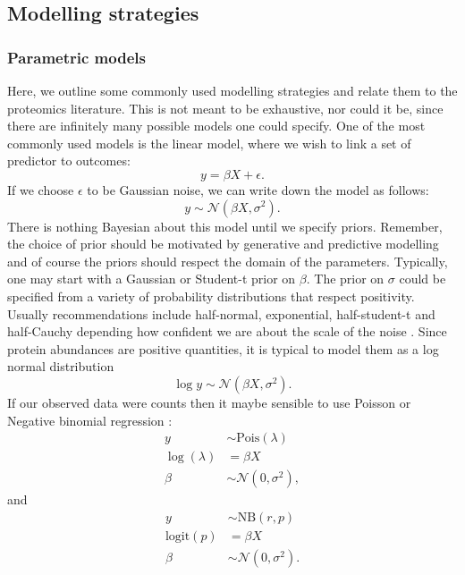 \documentclass[12pt,english, journal=jpr, layout=twocolumn]{article}
\begin{document}
\subsection{Modelling strategies}
\subsubsection{Parametric models}
Here, we outline some commonly used modelling strategies and relate them to the proteomics literature. This is not meant to be exhaustive, nor could it be, since there are infinitely many possible models one could specify. One of the most commonly used models is the linear model, where we wish to link a set of predictor to outcomes:
\begin{equation}
y = \beta X + \epsilon.
\end{equation}
If we choose $\epsilon$ to be Gaussian noise, we can write down the model as follows:
\begin{equation}
y \sim \mathcal{N}(\beta X, \sigma^2).
\end{equation}
There is nothing Bayesian about this model until we specify priors. Remember, the choice of prior should be motivated by generative and predictive modelling and of course the priors should respect the domain of the parameters. Typically, one may start with a Gaussian or Student-t prior on $\beta$. The prior on $\sigma$ could be specified from a variety of probability distributions that respect positivity. Usually recommendations include half-normal, exponential, half-student-t and half-Cauchy depending how confident we are about the scale of the noise \citep{Gelman::2017}. Since protein abundances are positive quantities, it is typical to model them as a log normal distribution
\begin{equation}
\log y  \sim \mathcal{N}(\beta X, \sigma^2).
\end{equation}   	
If our observed data were counts then it maybe sensible to use Poisson or Negative binomial regression \citep{Lawless::1987}:
\begin{equation}
\begin{split}
y &\sim \text{Pois}(\lambda)\\
\log(\lambda) &= \beta X\\
\beta &\sim \mathcal{N}(0, \sigma^2),
\end{split}
\end{equation}
and
\begin{equation}
	\begin{split}
		y &\sim \text{NB}(r, p)\\
		\text{logit}(p) &= \beta X\\
		\beta &\sim \mathcal{N}(0, \sigma^2).
	\end{split}
\end{equation}
\end{document}
